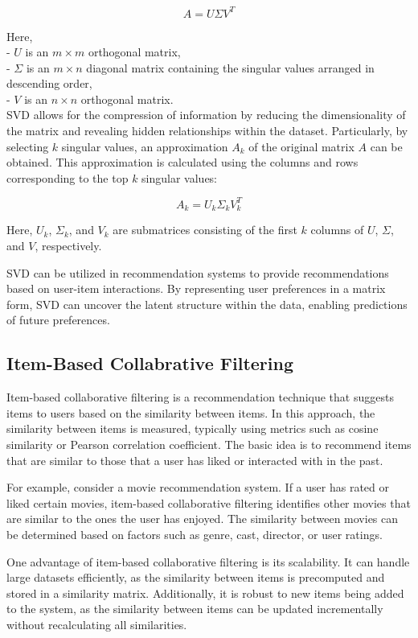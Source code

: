 \documentclass[conference]{IEEEtran}
\begin{document}
\[ A = U \Sigma V^T \]

Here, \\
- $U$ is an $m \times m$ orthogonal matrix, \\
- $\Sigma$ is an $m \times n$ diagonal matrix containing the singular values arranged in descending order, \\
- $V$ is an $n \times n$ orthogonal matrix.\\

SVD allows for the compression of information by reducing the dimensionality of the matrix and revealing hidden relationships within the dataset. Particularly, by selecting $k$ singular values, an approximation $A_k$ of the original matrix $A$ can be obtained. This approximation is calculated using the columns and rows corresponding to the top $k$ singular values:

\[ A_k = U_k \Sigma_k V_k^T \]

Here, $U_k$, $\Sigma_k$, and $V_k$ are submatrices consisting of the first $k$ columns of $U$, $\Sigma$, and $V$, respectively.

SVD can be utilized in recommendation systems to provide recommendations based on user-item interactions. By representing user preferences in a matrix form, SVD can uncover the latent structure within the data, enabling predictions of future preferences.

\subsection{Item-Based Collabrative Filtering}

Item-based collaborative filtering is a recommendation technique that suggests items to users based on the similarity between items. In this approach, the similarity between items is measured, typically using metrics such as cosine similarity or Pearson correlation coefficient. The basic idea is to recommend items that are similar to those that a user has liked or interacted with in the past.

For example, consider a movie recommendation system. If a user has rated or liked certain movies, item-based collaborative filtering identifies other movies that are similar to the ones the user has enjoyed. The similarity between movies can be determined based on factors such as genre, cast, director, or user ratings.

One advantage of item-based collaborative filtering is its scalability. It can handle large datasets efficiently, as the similarity between items is precomputed and stored in a similarity matrix. Additionally, it is robust to new items being added to the system, as the similarity between items can be updated incrementally without recalculating all similarities.
\end{document}

